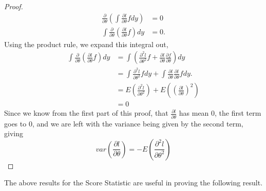 \begin{proof}
    \begin{align*}
        \frac{\partial}{\partial \theta}\left( \int \frac{\partial l}{\partial \theta} f dy\right) &= 0 \\
        \int \frac{\partial}{\partial \theta} \left( \frac{\partial l}{\partial \theta}f\right)dy &=0. 
    \end{align*}
    Using the product rule, we expand this integral out,
    \begin{align*}
        \int \frac{\partial}{\partial \theta} \left( \frac{\partial l}{\partial \theta}f\right)dy &= 
        \int \left( \frac{\partial^2 l }{\partial \theta^2}f + \frac{\partial l}{\partial \theta}\frac{\partial f}{\partial \theta} \right)dy \\
        &= \int \frac{\partial^2 l}{\partial \theta^2}f dy + \int \frac{\partial l}{\partial \theta}\frac{\partial l}{\partial \theta}f dy. \\
        &= 
        E\left(\frac{\partial^2 l}{\partial \theta^2}\right) + E\left( \left( \frac{\partial l}{\partial \theta}\right)^2\right) \\
        &= 0       
    \end{align*}
    Since we know from the first part of this proof, that $\frac{\partial l }{\partial \theta}$ has mean 0, the first term goes to 0, and we are left with the variance being given by the second term, giving 
    \[
        var\left(\frac{\partial l}{\partial \theta }\right) = -E\left(\frac{\partial^2 l}{\partial \theta^2}\right)
    \]
\end{proof}

The above results for the Score Statistic are useful in proving the following result.

